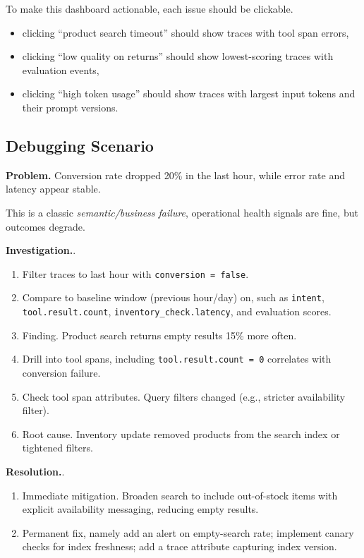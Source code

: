 To make this dashboard actionable, each issue should be clickable.
\begin{itemize}
\item clicking ``product search timeout'' should show traces with tool span errors,
\item clicking ``low quality on returns'' should show lowest-scoring traces with evaluation events,
\item clicking ``high token usage'' should show traces with largest input tokens and their prompt versions.
\end{itemize}

\subsection{Debugging Scenario}

\textbf{Problem.} Conversion rate dropped 20\% in the last hour, while error rate and latency appear stable.

This is a classic \emph{semantic/business failure}, operational health signals are fine, but outcomes degrade.

\textbf{Investigation.}.
\begin{enumerate}
\item Filter traces to last hour with \texttt{conversion = false}.
\item Compare to baseline window (previous hour/day) on, such as \texttt{intent}, \texttt{tool.result.count}, \texttt{inventory\_check.latency},
      and evaluation scores.
\item Finding. Product search returns empty results 15\% more often.
\item Drill into tool spans, including \texttt{tool.result.count = 0} correlates with conversion failure.
\item Check tool span attributes. Query filters changed (e.g., stricter availability filter).
\item Root cause. Inventory update removed products from the search index or tightened filters.
\end{enumerate}

\textbf{Resolution.}.
\begin{enumerate}
\item Immediate mitigation. Broaden search to include out-of-stock items with explicit availability messaging, reducing empty results.
\item Permanent fix, namely add an alert on empty-search rate; implement canary checks for index freshness; add a trace attribute capturing index version.
\end{enumerate}

